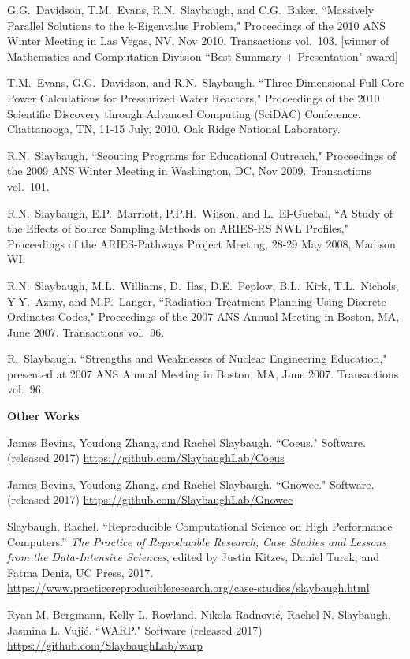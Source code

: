 \begin{bibsection}
\item G.G.\ Davidson, T.M.\ Evans, R.N.\ Slaybaugh, and C.G.\ Baker.  ``Massively Parallel Solutions to the k-Eigenvalue Problem," Proceedings of the 2010 ANS Winter Meeting in Las Vegas, NV, Nov 2010. Transactions vol.\ 103. [winner of Mathematics and Computation Division ``Best Summary + Presentation" award]

\item T.M.\ Evans, G.G.\ Davidson, and R.N.\ Slaybaugh.  ``Three-Dimensional Full Core Power Calculations for Pressurized Water Reactors," Proceedings of the 2010 Scientific Discovery through Advanced Computing (SciDAC) Conference. Chattanooga, TN, 11-15 July, 2010. Oak Ridge National Laboratory.

\item R.N.\ Slaybaugh, ``Scouting Programs for Educational Outreach," Proceedings of the 2009 ANS Winter Meeting in Washington, DC, Nov 2009. Transactions vol.\ 101.

\item R.N.\ Slaybaugh, E.P.\ Marriott, P.P.H.\ Wilson, and L.\ El-Guebal, ``A Study of the Effects of Source Sampling Methods on ARIES-RS NWL Profiles," Proceedings of the ARIES-Pathways Project Meeting, 28-29 May 2008, Madison WI. 

\item R.N.\ Slaybaugh, M.L.\ Williams, D.\ Ilas, D.E.\ Peplow, B.L.\ Kirk, T.L.\ Nichols, Y.Y.\ Azmy, and M.P.\ Langer, ``Radiation Treatment Planning Using Discrete Ordinates Codes," Proceedings of the 2007 ANS Annual Meeting in Boston, MA, June 2007. Transactions vol.\ 96.

\item R.\ Slaybaugh. ``Strengths and Weaknesses of Nuclear Engineering Education," presented at 2007 ANS Annual Meeting in Boston, MA, June 2007. Transactions vol.\ 96.


\item \textbf{Other Works}
\item James Bevins, Youdong Zhang, and Rachel Slaybaugh. ``Coeus." Software. (released 2017) \url{https://github.com/SlaybaughLab/Coeus} 

\item James Bevins, Youdong Zhang, and Rachel Slaybaugh. ``Gnowee." Software. (released 2017) \url{https://github.com/SlaybaughLab/Gnowee} 

\item Slaybaugh, Rachel. ``Reproducible Computational Science on High Performance Computers.'' \textit{The Practice of Reproducible Research, Case Studies and Lessons from the Data-Intensive Sciences}, edited by Justin Kitzes, Daniel Turek, and Fatma Deniz, UC Press, 2017. \\ \url{https://www.practicereproducibleresearch.org/case-studies/slaybaugh.html}

\item Ryan M. Bergmann, Kelly L. Rowland, Nikola Radnovi\'c, Rachel N. Slaybaugh, Jasmina L. Vuji\'c. ``WARP." Software (released 2017) \url{https://github.com/SlaybaughLab/warp}

\end{bibsection}

